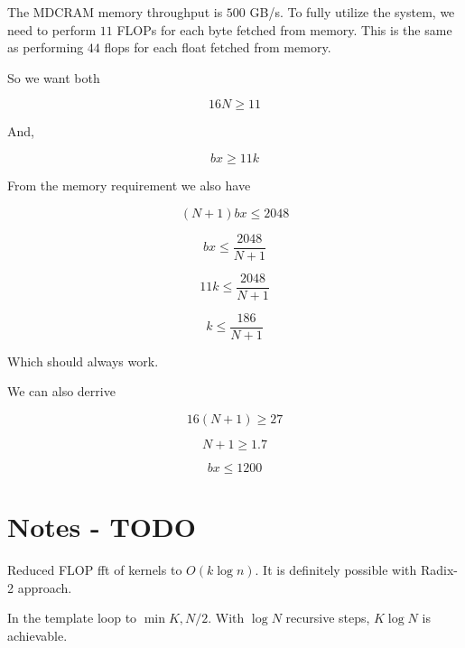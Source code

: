   The MDCRAM memory throughput is $500$ GB/s.  To fully utilize the
  system, we need to perform $11$ FLOPs for each byte fetched from
  memory.  This is the same as performing $44$ flops for each float
  fetched from memory.

  So we want both

  $$16N \ge 11$$

  And,

  $$bx \ge 11k$$

  From the memory requirement we also have

  $$(N+1)bx \le 2048$$

  $$bx \le \frac{2048}{N+1}$$

  $$11k \le \frac{2048}{N+1}$$

  $$k \le \frac{186}{N+1}$$

  Which should always work.

  We can also derrive

  $$16(N+1) \ge 27$$

  $$N+1 \ge 1.7$$

  $$bx \le 1200$$

\section{Notes - TODO}

  Reduced FLOP fft of kernels to $O(k \log n)$. It is definitely
  possible with Radix-2 approach.

  In the template loop to $\min{K, N/2}$.  With $\log N$ recursive
  steps, $K \log N$ is achievable.





